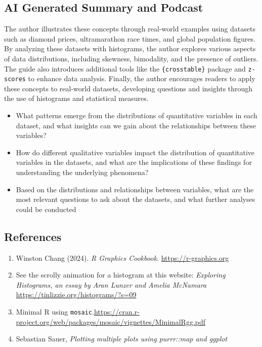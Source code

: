 \documentclass[
  letterpaper,
  DIV=11,
  numbers=noendperiod,
  oneside]{scrartcl}
\providecommand{\tightlist}{%
  \setlength{\itemsep}{0pt}\setlength{\parskip}{0pt}}
\begin{document}
\subsection{\texorpdfstring{ AI Generated Summary and
Podcast}{ AI Generated Summary and Podcast}}\label{ai-generated-summary-and-podcast}

The author illustrates these concepts through real-world examples using
datasets such as diamond prices, ultramarathon race times, and global
population figures. By analyzing these datasets with histograms, the
author explores various aspects of data distributions, including
skewness, bimodality, and the presence of outliers. The guide also
introduces additional tools like the \texttt{\{crosstable\}} package and
\texttt{z-scores} to enhance data analysis. Finally, the author
encourages readers to apply these concepts to real-world datasets,
developing questions and insights through the use of histograms and
statistical measures.

\begin{itemize}
\item
  What patterns emerge from the distributions of quantitative variables
  in each dataset, and what insights can we gain about the relationships
  between these variables?
\item
  How do different qualitative variables impact the distribution of
  quantitative variables in the datasets, and what are the implications
  of these findings for understanding the underlying phenomena?
\item
  Based on the distributions and relationships between variables, what
  are the most relevant questions to ask about the datasets, and what
  further analyses could be conducted
\end{itemize}

\subsection{\texorpdfstring{ References}{ References}}\label{references}

\begin{enumerate}
\def\labelenumi{\arabic{enumi}.}
\tightlist
\item
  Winston Chang (2024). \emph{R Graphics Cookbook}.
  \url{https://r-graphics.org}
\item
  See the scrolly animation for a histogram at this website:
  \emph{Exploring Histograms, an essay by Aran Lunzer and Amelia
  McNamara} \url{https://tinlizzie.org/histograms/?s=09}\\
\item
  Minimal R using
  \texttt{mosaic}.\url{https://cran.r-project.org/web/packages/mosaic/vignettes/MinimalRgg.pdf}\\
\item
  Sebastian Sauer, \emph{Plotting multiple plots using purrr::map and
  ggplot}
  \href{https://data-se.netlify.app/2021/02/06/plotting-multiple-plots-using-purrr-map-and-ggplot/}{}\\
\end{enumerate}
\end{document}
